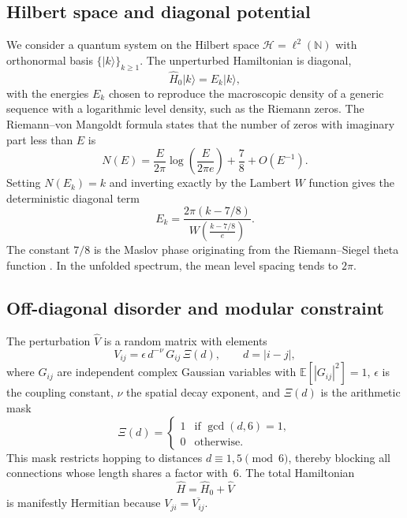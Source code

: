 \documentclass[11pt,a4paper]{article}
\newcommand{\Hilb}{\mathcal{H}}
\begin{document}
\subsection{Hilbert space and diagonal potential}

We consider a quantum system on the Hilbert space $\Hilb = \ell^2(\mathbb{N})$ with orthonormal basis $\{|k\rangle\}_{k\ge 1}$. The unperturbed Hamiltonian is diagonal,
\begin{equation}
\hat H_0 |k\rangle = E_k |k\rangle,
\end{equation}
with the energies $E_k$ chosen to reproduce the macroscopic density of a generic sequence with a logarithmic level density, such as the Riemann zeros. The Riemann--von Mangoldt formula states that the number of zeros with imaginary part less than $E$ is
\begin{equation}
N(E) = \frac{E}{2\pi}\log\left(\frac{E}{2\pi e}\right) + \frac{7}{8} + O(E^{-1}).
\end{equation}
Setting $N(E_k)=k$ and inverting exactly by the Lambert $W$ function gives the deterministic diagonal term
\begin{equation}
\boxed{ E_k = \frac{2\pi (k - 7/8)}{W\!\left(\frac{k-7/8}{e}\right)} }.
\label{eq:diag}
\end{equation}
The constant $7/8$ is the Maslov phase originating from the Riemann--Siegel theta function \cite{Corless1996}. In the unfolded spectrum, the mean level spacing tends to $2\pi$.

\subsection{Off-diagonal disorder and modular constraint}

The perturbation $\hat V$ is a random matrix with elements
\begin{equation}
V_{ij} = \epsilon \, d^{-\nu} \, G_{ij} \, \Xi(d),
\qquad d = |i-j|,
\end{equation}
where $G_{ij}$ are independent complex Gaussian variables with $\mathbb{E}[|G_{ij}|^2]=1$, $\epsilon$ is the coupling constant, $\nu$ the spatial decay exponent, and $\Xi(d)$ is the arithmetic mask
\begin{equation}
\Xi(d) = \begin{cases}
1 & \text{if } \gcd(d,6)=1,\\
0 & \text{otherwise}.
\end{cases}
\end{equation}
This mask restricts hopping to distances $d\equiv1,5\pmod6$, thereby blocking all connections whose length shares a factor with~6. The total Hamiltonian
\begin{equation}
\hat H = \hat H_0 + \hat V
\label{eq:fullH}
\end{equation}
is manifestly Hermitian because $V_{ji} = \overline{V_{ij}}$.
\end{document}
